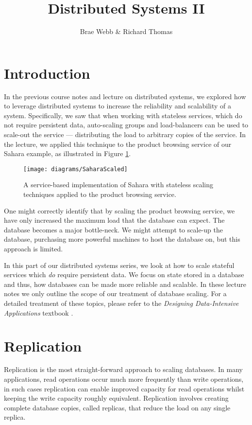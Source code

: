 \title{Distributed Systems II}
\author{Brae Webb \& Richard Thomas}
\date{}

\maketitle

\section{Introduction}
In the previous course notes \cite{distributed1-notes} and lecture \cite{distributed1-slides} on distributed systems,
we explored how to leverage distributed systems to increase the reliability and scalability of a system.
Specifically, we saw that when working with stateless services, which do not require persistent data,
auto-scaling groups and load-balancers can be used to scale-out the service --- distributing the load to arbitrary copies of the service.
In the lecture, we applied this technique to the product browsing service of our Sahara example,
as illustrated in Figure \ref{fig:scaled-sahara}.

\begin{figure}[H]
\begin{center}
\texttt{[image: diagrams/SaharaScaled]}
\end{center}
\caption{A service-based implementation of Sahara with stateless scaling techniques applied to the product browsing service.}
\label{fig:scaled-sahara}
\end{figure}

One might correctly identify that by scaling the product browsing service,
we have only increased the maximum load that the database can expect.
The database becomes a major bottle-neck.
We might attempt to scale-up the database,
purchasing more powerful machines to host the database on,
but this approach is limited.

In this part of our distributed systems series,
we look at how to scale stateful services which \textsl{do} require persistent data.
We focus on state stored in a database and thus,
how databases can be made more reliable and scalable.
In these lecture notes we only outline the scope of our treatment of database scaling.
For a detailed treatment of these topics,
please refer to the \textit{Designing Data-Intensive Applications} textbook \cite{data-intensive}.

\section{Replication}
Replication is the most straight-forward approach to scaling databases.
In many applications, read operations occur much more frequently than write operations,
in such cases replication can enable improved capacity for read operations whilst keeping the write capacity roughly equivalent.
Replication involves creating complete database copies, called replicas,
that reduce the load on any single replica.

